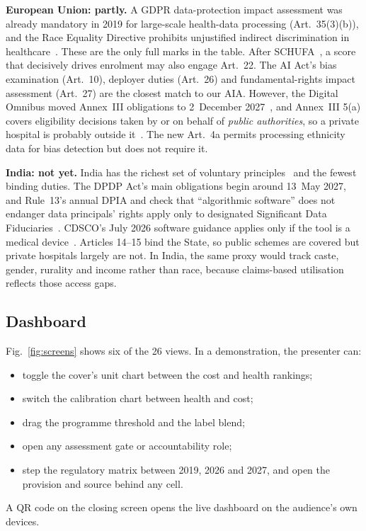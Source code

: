 \documentclass[conference]{IEEEtran}
\begin{document}
\textbf{European Union: partly.} A GDPR data-protection impact assessment was already mandatory in 2019 for large-scale health-data processing (Art.~35(3)(b)), and the Race Equality Directive prohibits unjustified indirect discrimination in healthcare~\cite{gdpr,red2000}. These are the only full marks in the table. After SCHUFA~\cite{schufa2023}, a score that decisively drives enrolment may also engage Art.~22. The AI Act's bias examination (Art.~10), deployer duties (Art.~26) and fundamental-rights impact assessment (Art.~27) are the closest match to our AIA. However, the Digital Omnibus moved Annex~III obligations to 2~December 2027~\cite{omnibus2026}, and Annex~III 5(a) covers eligibility decisions taken by or on behalf of \emph{public authorities}, so a private hospital is probably outside it~\cite{euaiact}. The new Art.~4a permits processing ethnicity data for bias detection but does not require it.

\textbf{India: not yet.} India has the richest set of voluntary principles~\cite{icmr2023,niti2021,meity2025} and the fewest binding duties. The DPDP Act's main obligations begin around 13~May 2027, and Rule~13's annual DPIA and check that ``algorithmic software'' does not endanger data principals' rights apply only to designated Significant Data Fiduciaries~\cite{dpdp2023,dpdprules2025}. CDSCO's July 2026 software guidance applies only if the tool is a medical device~\cite{cdsco2026}. Articles 14--15 bind the State, so public schemes are covered but private hospitals largely are not. In India, the same proxy would track caste, gender, rurality and income rather than race, because claims-based utilisation reflects those access gaps.



\subsection{Dashboard}
Fig.~\ref{fig:screens} shows six of the 26 views. In a demonstration, the presenter can:
\begin{itemize}
\item toggle the cover's unit chart between the cost and health rankings;
\item switch the calibration chart between health and cost;
\item drag the programme threshold and the label blend;
\item open any assessment gate or accountability role;
\item step the regulatory matrix between 2019, 2026 and 2027, and open the provision and source behind any cell.
\end{itemize}
A QR code on the closing screen opens the live dashboard on the audience's own devices.
\end{document}
